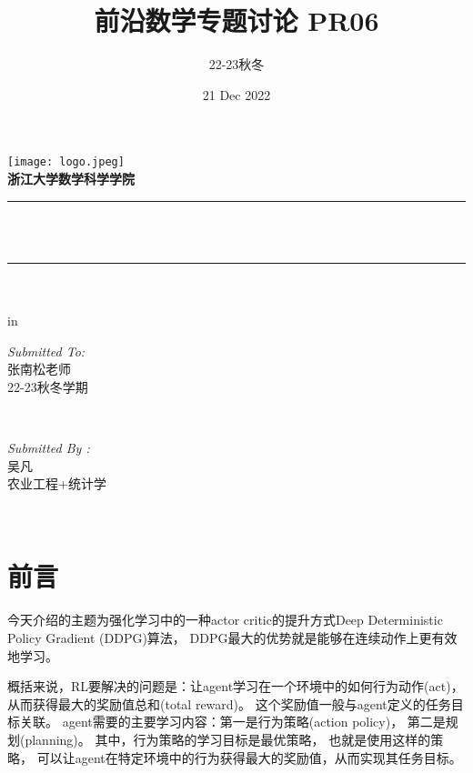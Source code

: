 \documentclass[12pt]{article}
\title{ 前沿数学专题讨论 PR06}								%
\author{22-23秋冬}								%
\date{21 Dec 2022}	%
\makeatletter
\let\thetitle\@title
\let\thedate\@date
\makeatother
\begin{document}

\begin{titlepage}
	\centering
    \vspace*{0.5 cm}
    \texttt{[image: logo.jpeg]}\\[1.0 cm]	%
	\textsc{\Large \textbf{浙江大学数学科学学院} }\\[0.5 cm]				%
	\rule{\linewidth}{0.2 mm} \\[0.4 cm]
	{ \huge \bfseries \thetitle}\\
	\rule{\linewidth}{0.2 mm} \\[1.5 cm]
	{  \bfseries \thedate}\\
	 in
	\begin{minipage}{0.4\textwidth}
		\begin{flushleft} \large
			\emph{Submitted To:}\\
			张南松老师\\
                22-23秋冬学期\\
			\end{flushleft}
			\end{minipage}~
			\begin{minipage}{0.4\textwidth}
            
			\begin{flushright} \large
			\emph{Submitted By :} \\
			吴凡\\
            农业工程+统计学\\
		\end{flushright}
        
	\end{minipage}\\[2 cm]		    
	
\end{titlepage}

\tableofcontents
\pagebreak




\section{前言}
今天介绍的主题为强化学习中的一种actor critic的提升方式Deep Deterministic Policy Gradient (DDPG)算法，
DDPG最大的优势就是能够在连续动作上更有效地学习。

概括来说，RL要解决的问题是：让agent学习在一个环境中的如何行为动作(act)， 从而获得最大的奖励值总和(total reward)。
这个奖励值一般与agent定义的任务目标关联。
agent需要的主要学习内容：第一是行为策略(action policy)， 第二是规划(planning)。
其中，行为策略的学习目标是最优策略， 也就是使用这样的策略，
可以让agent在特定环境中的行为获得最大的奖励值，从而实现其任务目标。
\end{document}
